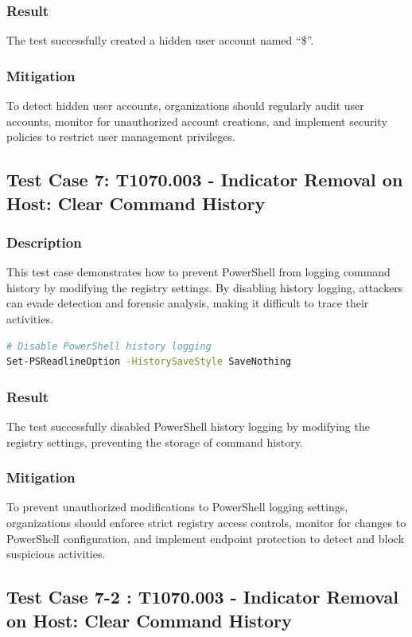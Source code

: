 \documentclass[11pt]{article}
\begin{document}
\subsubsection{Result}
The test successfully created a hidden user account named ``\$''.
\subsubsection{Mitigation}
To detect hidden user accounts, organizations should regularly audit user accounts, monitor for unauthorized account creations, and implement security policies to restrict user management privileges.
\subsection{Test Case 7: T1070.003 - Indicator Removal on Host: Clear Command History}
\subsubsection{Description}
This test case demonstrates how to prevent PowerShell from logging command history by modifying the registry settings. By disabling history logging, attackers can evade detection and forensic analysis, making it difficult to trace their activities.

\begin{lstlisting}[language=bash, caption=Prevent PowerShell History Logging]
# Disable PowerShell history logging
Set-PSReadlineOption -HistorySaveStyle SaveNothing
\end{lstlisting}

\subsubsection{Result}
The test successfully disabled PowerShell history logging by modifying the registry settings, preventing the storage of command history.

\subsubsection{Mitigation}
To prevent unauthorized modifications to PowerShell logging settings, organizations should enforce strict registry access controls, monitor for changes to PowerShell configuration, and implement endpoint protection to detect and block suspicious activities.

\subsection{Test Case 7-2 : T1070.003 - Indicator Removal on Host: Clear Command History}
\end{document}
